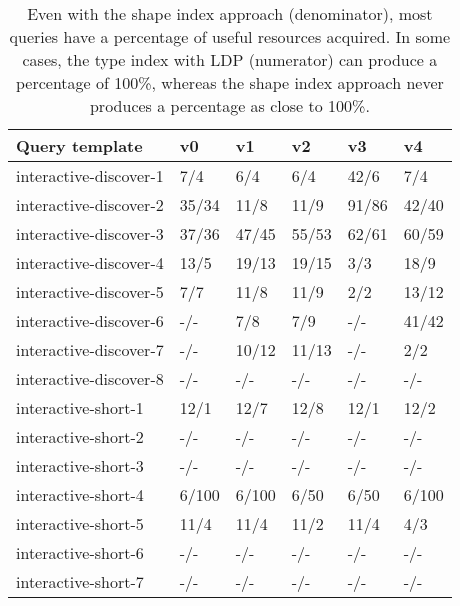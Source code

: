 \begin{table}
	\begin{center}
		\begin{tabular}{|l|l|l|l|l|l|}
			\hline
			Query template & v0 & v1 & v2 & v3 & v4 \\
			\hline
			interactive-discover-1 & 7/4 & 6/4 & 6/4 & 42/6 & 7/4 \\
			\hline
			interactive-discover-2 & 35/34 & 11/8 & 11/9 & 91/86 & 42/40 \\
			\hline
			interactive-discover-3 & 37/36 & 47/45 & 55/53 & 62/61 & 60/59 \\
			\hline
			interactive-discover-4 & 13/5 & 19/13 & 19/15 & 3/3 & 18/9 \\
			\hline
			interactive-discover-5 & 7/7 & 11/8 & 11/9 & 2/2 & 13/12 \\
			\hline
			interactive-discover-6 & -/- & 7/8 & 7/9 & -/- & 41/42 \\
			\hline
			interactive-discover-7 & -/- & 10/12 & 11/13 & -/- & 2/2 \\
			\hline
			interactive-discover-8 & -/- & -/- & -/- & -/- & -/- \\
			\hline
			interactive-short-1 & 12/1 & 12/7 & 12/8 & 12/1 & 12/2 \\
			\hline
			interactive-short-2 & -/- & -/- & -/- & -/- & -/- \\
			\hline
			interactive-short-3 & -/- & -/- & -/- & -/- & -/- \\
			\hline
			interactive-short-4 & 6/100 & 6/100 & 6/50 & 6/50 & 6/100 \\
			\hline
			interactive-short-5 & 11/4 & 11/4 & 11/2 & 11/4 & 4/3 \\
			\hline
			interactive-short-6 & -/- & -/- & -/- & -/- & -/- \\
			\hline
			interactive-short-7 & -/- & -/- & -/- & -/- & -/- \\
			\hline
		\end{tabular}
	\end{center}
	\caption{Even with the shape index approach (denominator), most queries have a percentage of useful resources acquired. In some cases, the type index with LDP (numerator) can produce a percentage of 100\%, whereas the shape index approach never produces a percentage as close to 100\%.}
	\label{tab:ratioUsefulResources}
\end{table}